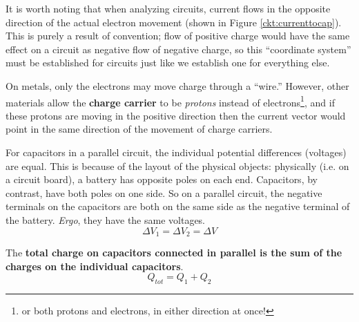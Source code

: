 It is worth noting that when analyzing circuits, current flows in the opposite
direction of the actual electron movement (shown in Figure
\ref{ckt:currenttocap}). This is purely a result of
convention; flow of positive charge would have the same effect on a circuit
as negative flow of negative charge, so this ``coordinate system'' must be
established for circuits just like we establish one for everything else.

On metals, only the electrons may move charge through a ``wire.'' However, other materials allow the
\textbf{charge carrier} to be \emph{protons} instead of electrons\footnote{or
both protons and electrons, in either direction at once!}, and if these
protons are moving in the positive direction then the current vector would point
in the same direction of the movement of charge carriers. 

For capacitors in a parallel circuit, the individual potential differences
(voltages) are equal. This is because of the layout of the physical objects:
physically (i.e. on a circuit board), a battery has opposite poles on each end.
Capacitors, by contrast, have both poles on one side. So on a parallel circuit,
the negative terminals on the capacitors are both on the same side as the
negative terminal of the battery. \emph{Ergo}, they have the same voltages.
\begin{equation}
  \Delta V_1 = \Delta V_2 = \Delta V
  \label{eq:potentialcapacitor}
\end{equation}
\begin{figure}[h]
  \begin{center}
  \end{center}
  \label{ckt:parcap}
\end{figure}
The \textbf{total charge on capacitors connected in parallel is the sum of the
charges on the individual capacitors}\cite[p.~728]{serway}.
\begin{equation}
  Q_{tot}=Q_1+Q_2
  \label{eq:capparcharge}
\end{equation}

